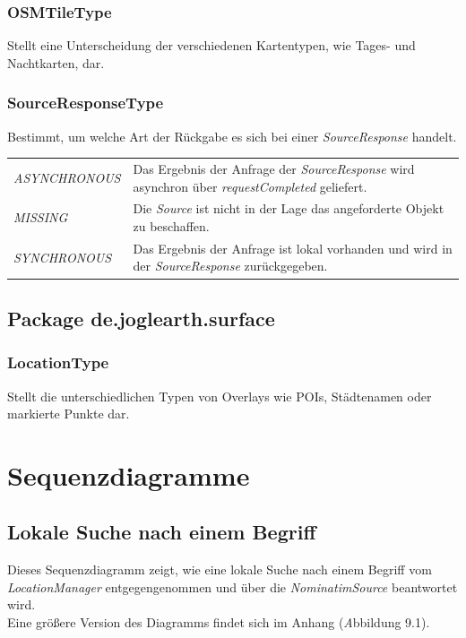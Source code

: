 \documentclass[10pt]{scrreprt}
\newcommand{\textref}[1]{\mbox{\raisebox{0.1ex}{\small$\rightarrow$ }\textit{#1}}}
\begin{document}
\vspace{5mm}
\subsection*{OSMTileType}
Stellt eine Unterscheidung der verschiedenen Kartentypen, wie Tages- und Nachtkarten, dar.

\vspace{5mm}
\subsection*{SourceResponseType}
Bestimmt, um welche Art der Rückgabe es sich bei einer \textit{SourceResponse} handelt.\\[3mm]
\begin{tabular}{p{4cm} p{11cm}}
\textit{ASYNCHRONOUS} & Das Ergebnis der Anfrage der \textit{SourceResponse} wird asynchron über \textit{requestCompleted} geliefert.\\
\textit{MISSING} & Die \textit{Source} ist nicht in der Lage das angeforderte Objekt zu beschaffen.\\
\textit{SYNCHRONOUS} & Das Ergebnis der Anfrage ist lokal vorhanden und wird in der \textit{SourceResponse} zurückgegeben.\\
\end{tabular}


\vspace{5mm}
\section*{Package de.joglearth.surface}
\subsection*{LocationType}
Stellt die unterschiedlichen Typen von Overlays wie POIs, Städtenamen oder markierte Punkte dar.



\chapter{Sequenzdiagramme}

\section{Lokale Suche nach einem Begriff}
Dieses Sequenzdiagramm zeigt, wie eine lokale Suche nach einem Begriff vom \textit{LocationManager} entgegengenommen und über die \textit{NominatimSource} beantwortet wird.\\[3mm]
Eine größere Version des Diagramms findet sich im Anhang (\textref Abbildung 9.1).
\end{document}
